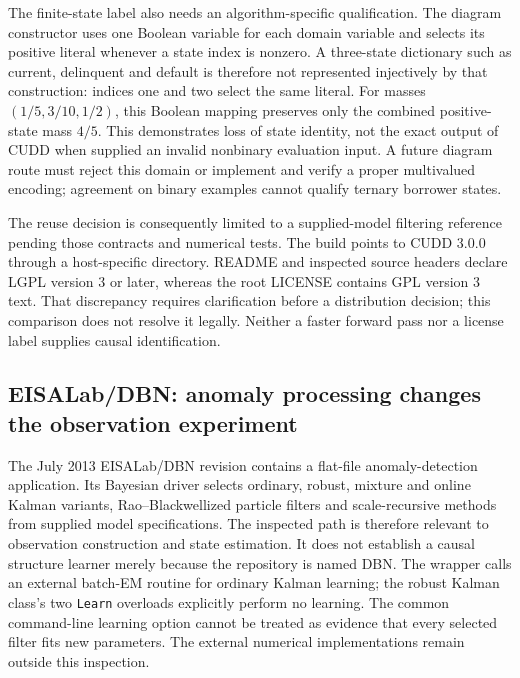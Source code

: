 The finite-state label also needs an algorithm-specific qualification. The
diagram constructor uses one Boolean variable for each domain variable and
selects its positive literal whenever a state index is nonzero. A three-state
dictionary such as current, delinquent and default is therefore not represented
injectively by that construction: indices one and two select the same literal.
For masses $(1/5,3/10,1/2)$, this Boolean mapping preserves only the combined
positive-state mass $4/5$. This demonstrates loss of state identity, not the
exact output of CUDD when supplied an invalid nonbinary evaluation input. A
future diagram route must reject this domain or implement and verify a proper
multivalued encoding; agreement on binary examples cannot qualify ternary
borrower states. \citep{rel19dbnpp,rel19dbnwitness}

The reuse decision is consequently limited to a supplied-model filtering
reference pending those contracts and numerical tests. The build points to
CUDD 3.0.0 through a host-specific directory. README and inspected source
headers declare LGPL version 3 or later, whereas the root LICENSE contains
GPL version 3 text. That discrepancy requires clarification before a
distribution decision; this comparison does not resolve it legally. Neither
a faster forward pass nor a license label supplies causal identification.
\citep{rel19dbnpp}

\subsection{EISALab/DBN: anomaly processing changes the observation experiment}
\label{rel19:eisadbn}

The July 2013 EISALab/DBN revision contains a flat-file anomaly-detection
application. Its Bayesian driver selects ordinary, robust, mixture and online
Kalman variants, Rao--Blackwellized particle filters and scale-recursive
methods from supplied model specifications. The inspected path is therefore
relevant to observation construction and state estimation. It does not
establish a causal structure learner merely because the repository is named
DBN. The wrapper calls an external batch-EM routine for ordinary Kalman
learning; the robust Kalman class's two \texttt{Learn} overloads explicitly
perform no learning. The common command-line learning option cannot be treated
as evidence that every selected filter fits new parameters. The external
numerical implementations remain outside this inspection. \citep{rel19eisadbn}

